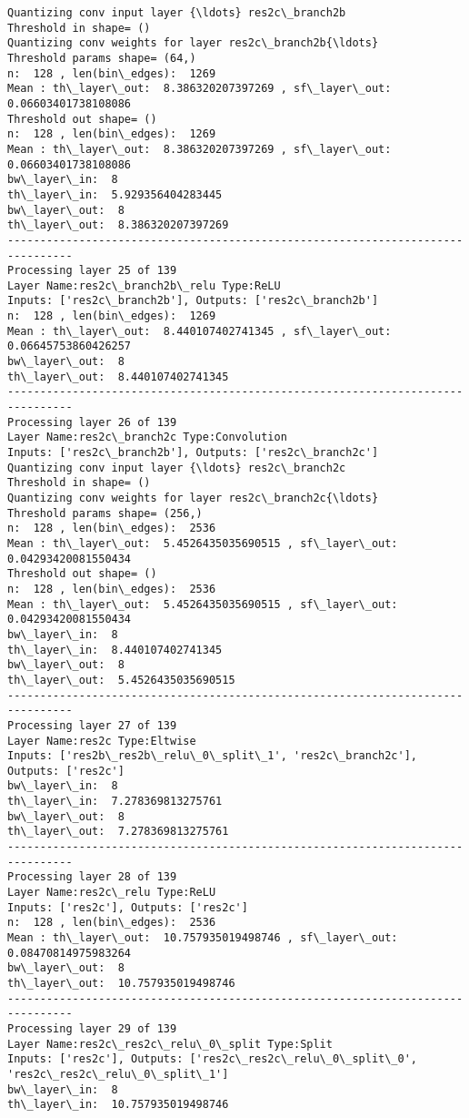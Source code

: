 \documentclass[11pt]{article}
\begin{document}
\begin{Verbatim}[commandchars=\\\{\}]
Quantizing conv input layer {\ldots} res2c\_branch2b
Threshold in shape= ()
Quantizing conv weights for layer res2c\_branch2b{\ldots}
Threshold params shape= (64,)
n:  128 , len(bin\_edges):  1269
Mean : th\_layer\_out:  8.386320207397269 , sf\_layer\_out:  0.06603401738108086
Threshold out shape= ()
n:  128 , len(bin\_edges):  1269
Mean : th\_layer\_out:  8.386320207397269 , sf\_layer\_out:  0.06603401738108086
bw\_layer\_in:  8
th\_layer\_in:  5.929356404283445
bw\_layer\_out:  8
th\_layer\_out:  8.386320207397269
--------------------------------------------------------------------------------
Processing layer 25 of 139
Layer Name:res2c\_branch2b\_relu Type:ReLU
Inputs: ['res2c\_branch2b'], Outputs: ['res2c\_branch2b']
n:  128 , len(bin\_edges):  1269
Mean : th\_layer\_out:  8.440107402741345 , sf\_layer\_out:  0.06645753860426257
bw\_layer\_out:  8
th\_layer\_out:  8.440107402741345
--------------------------------------------------------------------------------
Processing layer 26 of 139
Layer Name:res2c\_branch2c Type:Convolution
Inputs: ['res2c\_branch2b'], Outputs: ['res2c\_branch2c']
Quantizing conv input layer {\ldots} res2c\_branch2c
Threshold in shape= ()
Quantizing conv weights for layer res2c\_branch2c{\ldots}
Threshold params shape= (256,)
n:  128 , len(bin\_edges):  2536
Mean : th\_layer\_out:  5.4526435035690515 , sf\_layer\_out:  0.04293420081550434
Threshold out shape= ()
n:  128 , len(bin\_edges):  2536
Mean : th\_layer\_out:  5.4526435035690515 , sf\_layer\_out:  0.04293420081550434
bw\_layer\_in:  8
th\_layer\_in:  8.440107402741345
bw\_layer\_out:  8
th\_layer\_out:  5.4526435035690515
--------------------------------------------------------------------------------
Processing layer 27 of 139
Layer Name:res2c Type:Eltwise
Inputs: ['res2b\_res2b\_relu\_0\_split\_1', 'res2c\_branch2c'], Outputs: ['res2c']
bw\_layer\_in:  8
th\_layer\_in:  7.278369813275761
bw\_layer\_out:  8
th\_layer\_out:  7.278369813275761
--------------------------------------------------------------------------------
Processing layer 28 of 139
Layer Name:res2c\_relu Type:ReLU
Inputs: ['res2c'], Outputs: ['res2c']
n:  128 , len(bin\_edges):  2536
Mean : th\_layer\_out:  10.757935019498746 , sf\_layer\_out:  0.08470814975983264
bw\_layer\_out:  8
th\_layer\_out:  10.757935019498746
--------------------------------------------------------------------------------
Processing layer 29 of 139
Layer Name:res2c\_res2c\_relu\_0\_split Type:Split
Inputs: ['res2c'], Outputs: ['res2c\_res2c\_relu\_0\_split\_0', 'res2c\_res2c\_relu\_0\_split\_1']
bw\_layer\_in:  8
th\_layer\_in:  10.757935019498746

\end{Verbatim}
\end{document}
